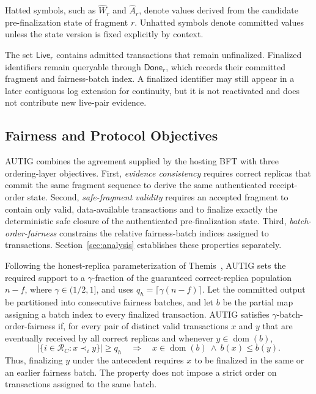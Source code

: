 Hatted symbols, such as $\widehat W_r$ and $\widehat A_r$, denote values derived from the candidate pre-finalization state of fragment $r$.  Unhatted symbols denote committed values unless the state version is fixed explicitly by context.

The set $\mathsf{Live}_r$ contains admitted transactions that remain unfinalized. Finalized identifiers remain queryable through $\mathsf{Done}_r$, which records their committed fragment and fairness-batch index. A finalized identifier may still appear in a later contiguous log extension for continuity, but it is not reactivated and does not contribute new live-pair evidence.

\subsection{Fairness and Protocol Objectives}
\label{sec:fairness-objective}

AUTIG combines the agreement supplied by the hosting BFT with three ordering-layer objectives.  First, \emph{evidence consistency} requires correct replicas that commit the same fragment sequence to derive the same authenticated
receipt-order state.  Second, \emph{safe-fragment validity} requires an accepted fragment to contain only valid, data-available transactions and to finalize exactly the deterministic safe closure of the authenticated pre-finalization state.  Third, \emph{batch-order-fairness} constrains the relative fairness-batch indices assigned to transactions.  Section~\ref{sec:analysis} establishes these properties separately.

Following the honest-replica parameterization of Themis~\cite{kelkar2023themis}, AUTIG sets the required support to a $\gamma$-fraction of the guaranteed correct-replica population $n-f$, where $\gamma\in(1/2,1]$, and uses $q_h=\lceil\gamma(n-f)\rceil$.
Let the committed output be partitioned into consecutive fairness batches, and let $b$ be the partial map assigning a batch index to every finalized transaction. AUTIG satisfies $\gamma$-batch-order-fairness if, for every pair of distinct valid transactions $x$ and $y$ that are eventually received by all correct replicas and whenever $y\in\operatorname{dom}(b)$,
\begin{equation}
 \left|\{i\in\mathcal R_C:x\prec_i y\}\right|\ge q_h
 \quad\Longrightarrow\quad
 x\in\operatorname{dom}(b)\ \land\ b(x)\le b(y).
 \label{eq:batch-order-fairness}
\end{equation}
Thus, finalizing $y$ under the antecedent requires $x$ to be finalized in the same or an earlier fairness batch. The property does not impose a strict order on transactions assigned to the same batch.

